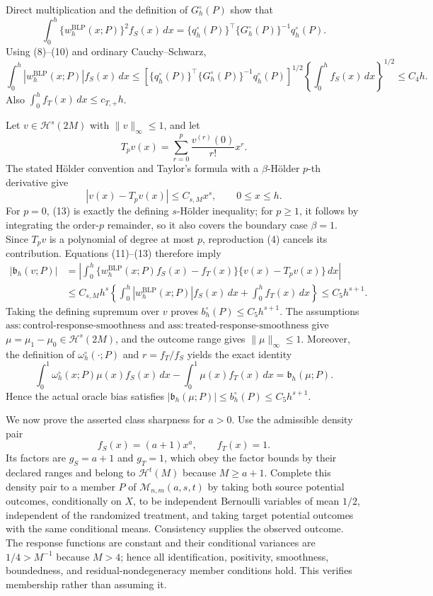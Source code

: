 Direct multiplication and the definition of \(G_h^{\circ}(P)\) show that
\[
\int_0^h\{w_h^{\mathrm{BLP}}(x;P)\}^2f_S(x)\,dx
=\{q_h^{\circ}(P)\}^\top\{G_h^{\circ}(P)\}^{-1}q_h^{\circ}(P).
\tag{10}
\]
Using (8)--(10) and ordinary Cauchy--Schwarz,
\[
\int_0^h|w_h^{\mathrm{BLP}}(x;P)|f_S(x)\,dx
\le
\left[\{q_h^{\circ}(P)\}^\top\{G_h^{\circ}(P)\}^{-1}q_h^{\circ}(P)\right]^{1/2}
\left\{\int_0^hf_S(x)\,dx\right\}^{1/2}
\le C_4h.
\tag{11}
\]
Also \(\int_0^hf_T(x)\,dx\le c_{T,+}h\).

Let \(v\in\mathcal H^s(2M)\) with \(\|v\|_\infty\le1\), and let
\[
T_pv(x)=\sum_{r=0}^p\frac{v^{(r)}(0)}{r!}x^r.
\tag{12}
\]
The stated H\"older convention and Taylor's formula with a \(\beta\)-H\"older \(p\)-th derivative give
\[
|v(x)-T_pv(x)|\le C_{s,M}x^s,
\qquad 0\le x\le h.
\tag{13}
\]
For \(p=0\), (13) is exactly the defining \(s\)-H\"older inequality; for \(p\ge1\), it follows by integrating the order-\(p\) remainder, so it also covers the boundary case \(\beta=1\). Since \(T_pv\) is a polynomial of degree at most \(p\), reproduction (4) cancels its contribution. Equations (11)--(13) therefore imply
\[
\begin{aligned}
|\mathfrak b_h(v;P)|
&=\left|\int_0^h\{w_h^{\mathrm{BLP}}(x;P)f_S(x)-f_T(x)\}\{v(x)-T_pv(x)\}\,dx\right|\\
&\le C_{s,M}h^s
\left\{\int_0^h|w_h^{\mathrm{BLP}}(x;P)|f_S(x)\,dx+\int_0^hf_T(x)\,dx\right\}
\le C_5h^{s+1}.
\end{aligned}
\tag{14}
\]
Taking the defining supremum over \(v\) proves \(b_h^{\circ}(P)\le C_5h^{s+1}\). The assumptions \(\mathrm{ass:control\text{-}response\text{-}smoothness}\) and \(\mathrm{ass:treated\text{-}response\text{-}smoothness}\) give \(\mu=\mu_1-\mu_0\in\mathcal H^s(2M)\), and the outcome range gives \(\|\mu\|_\infty\le1\). Moreover, the definition of \(\omega_h^{\circ}(\cdot;P)\) and \(r=f_T/f_S\) yields the exact identity
\[
\int_0^1\omega_h^{\circ}(x;P)\mu(x)f_S(x)\,dx-
\int_0^1\mu(x)f_T(x)\,dx=\mathfrak b_h(\mu;P).
\tag{15}
\]
Hence the actual oracle bias satisfies \(|\mathfrak b_h(\mu;P)|\le b_h^{\circ}(P)\le C_5h^{s+1}\).

We now prove the asserted class sharpness for \(a>0\). Use the admissible density pair
\[
f_S(x)=(a+1)x^a,
\qquad f_T(x)=1.
\tag{16}
\]
Its factors are \(g_S=a+1\) and \(g_T=1\), which obey the factor bounds by their declared ranges and belong to \(\mathcal H^t(M)\) because \(M\ge a+1\). Complete this density pair to a member \(P\) of \(\mathcal M_{n,m}(a,s,t)\) by taking both source potential outcomes, conditionally on \(X\), to be independent Bernoulli variables of mean \(1/2\), independent of the randomized treatment, and taking target potential outcomes with the same conditional means. Consistency supplies the observed outcome. The response functions are constant and their conditional variances are \(1/4>M^{-1}\) because \(M>4\); hence all identification, positivity, smoothness, boundedness, and residual-nondegeneracy member conditions hold. This verifies membership rather than assuming it.

